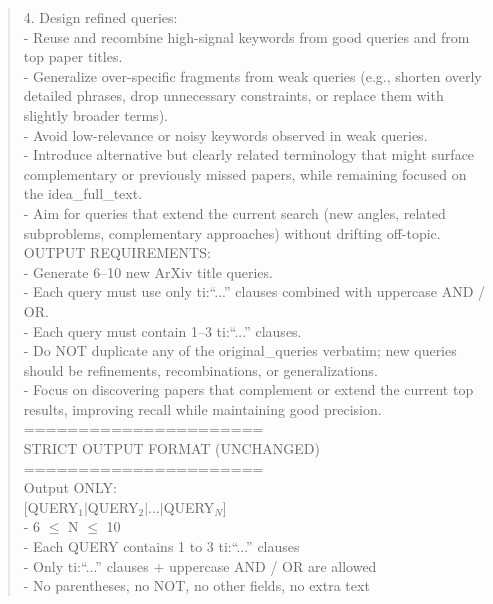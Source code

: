 \begin{quote}
\begin{tcolorbox}[breakable,colback=search!20!white, colframe=search!60!black, title=\textbf{Prompt for Search Agent (Query Refinement - Literature)}]
        4. Design refined queries:\\
        - Reuse and recombine high-signal keywords from good queries and from top paper titles.\\
        - Generalize over-specific fragments from weak queries (e.g., shorten overly detailed phrases, drop unnecessary constraints, or replace them with slightly broader terms).\\
        - Avoid low-relevance or noisy keywords observed in weak queries.\\
        - Introduce alternative but clearly related terminology that might surface complementary or previously missed papers, while remaining focused on the idea\_full\_text.\\
        - Aim for queries that extend the current search (new angles, related subproblems, complementary approaches) without drifting off-topic.\\

        OUTPUT REQUIREMENTS:\\
        - Generate 6–10 new ArXiv title queries.\\
        - Each query must use only ti:``...'' clauses combined with uppercase AND / OR.\\
        - Each query must contain 1–3 ti:``...'' clauses.\\
        - Do NOT duplicate any of the original\_queries verbatim; new queries should be refinements, recombinations, or generalizations.\\
        - Focus on discovering papers that complement or extend the current top results, improving recall while maintaining good precision.\\

        ======================\\
        STRICT OUTPUT FORMAT (UNCHANGED)\\
        ======================\\
        Output ONLY:\\

        [QUERY$_1$$\mid$QUERY$_2$$\mid$...$\mid$QUERY$_N$]\\

        - 6 $\leq$ N $\leq$ 10\\
        - Each QUERY contains 1 to 3 ti:``...'' clauses\\
        - Only ti:``...'' clauses + uppercase AND / OR are allowed\\
        - No parentheses, no NOT, no other fields, no extra text
    \end{tcolorbox}


\end{quote}
